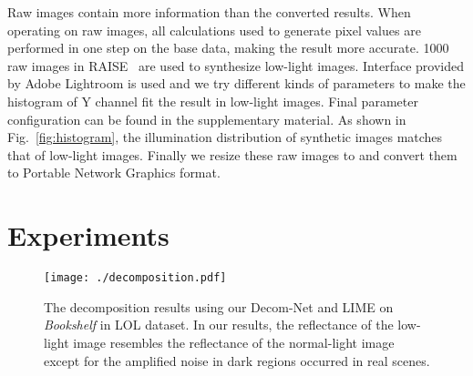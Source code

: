 \documentclass{bmvc2k}
\begin{document}
Raw images contain more information than the converted results. When operating on raw images, all calculations used to generate pixel values are performed in one step on the base data, making the result more accurate. 1000 raw images in RAISE~\cite{Dang2015RAISE} are used to synthesize low-light images. Interface provided by Adobe Lightroom is used and we try different kinds of parameters to make the histogram of Y channel fit the result in low-light images. Final parameter configuration can be found in the supplementary material.  As shown in Fig.~\ref{fig:histogram}, the illumination distribution of synthetic images matches that of low-light images. Finally we resize these raw images to  and convert them to Portable Network Graphics format.

\section{Experiments} \label{sec:experiment}

\begin{figure}
	\begin{minipage}[t]{\linewidth}
		\centering
		\texttt{[image: ./decomposition.pdf]}

        \vspace{-0.3cm}
	    \caption{The decomposition results using our Decom-Net and LIME on \emph{Bookshelf} in LOL dataset. In our results, the reflectance of the low-light image resembles the reflectance of the normal-light image except for the amplified noise in dark regions occurred in real scenes.}
	    \label{fig:decomposition}
    \end{minipage}
\end{figure}
\end{document}
